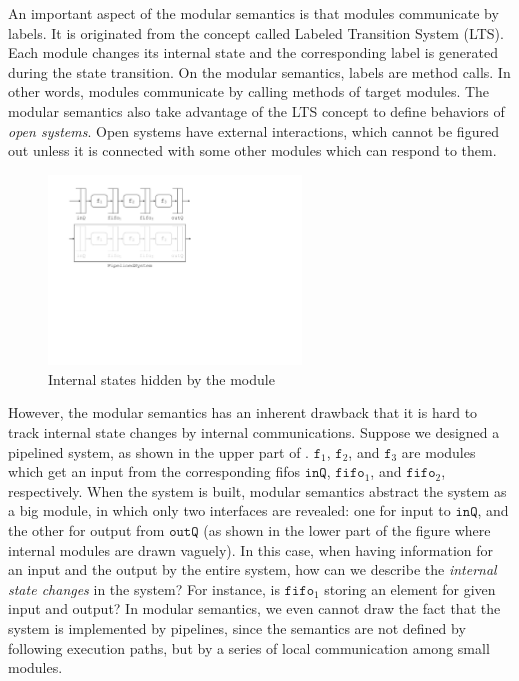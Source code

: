 An important aspect of the modular semantics is that modules
communicate by labels. It is originated from the concept called
Labeled Transition System (LTS). Each module changes its internal
state and the corresponding label is generated during the state
transition. On the modular semantics, labels are method calls. In
other words, modules communicate by calling methods of target modules.
The modular semantics also take advantage of the LTS concept to define
behaviors of \emph{open systems}. Open systems have external
interactions, which cannot be figured out unless it is connected with
some other modules which can respond to them.

\begin{figure}[t]
  \centering
  \includegraphics[width=0.6\textwidth]{figures/pipeline-internal.pdf}
  \caption{Internal states hidden by the module}
  \label{ex-modular-semantics-disadvantage}
\end{figure}

However, the modular semantics has an inherent drawback that it is
hard to track internal state changes by internal communications.
Suppose we designed a pipelined system, as shown in the upper part of
. $\texttt{f}_1$,
$\texttt{f}_2$, and $\texttt{f}_3$ are modules which get an input from
the corresponding fifos $\texttt{inQ}$, $\texttt{fifo}_1$, and
$\texttt{fifo}_2$, respectively. When the system is built, modular
semantics abstract the system as a big module, in which only two
interfaces are revealed: one for input to $\texttt{inQ}$, and the
other for output from $\texttt{outQ}$ (as shown in the lower part of
the figure where internal modules are drawn vaguely). In this case,
when having information for an input and the output by the entire
system, how can we describe the \emph{internal state changes} in the
system? For instance, is $\texttt{fifo}_1$ storing an element for
given input and output? In modular semantics, we even cannot draw the
fact that the system is implemented by pipelines, since the semantics
are not defined by following execution paths, but by a series of local
communication among small modules.

